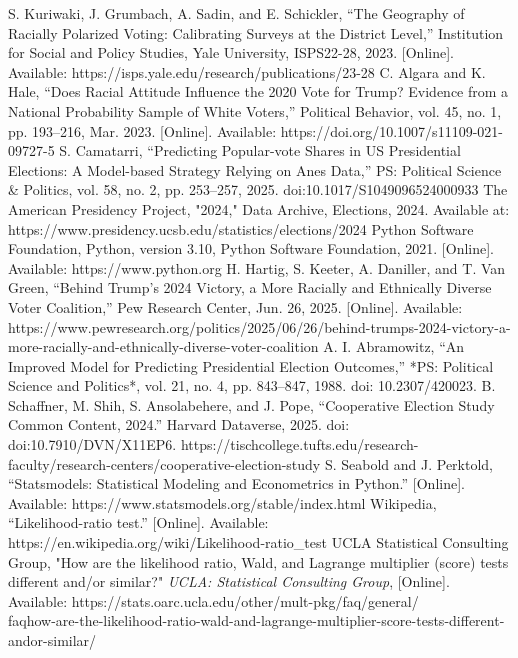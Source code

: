 \documentclass[letter]{article}
\begin{document}
\begin{thebibliography}{00}
 S. Kuriwaki, J. Grumbach, A. Sadin, and E. Schickler, “The Geography of Racially Polarized Voting: Calibrating Surveys at the District Level,” Institution for Social and Policy Studies, Yale University, ISPS22-28, 2023. [Online]. Available: https://isps.yale.edu/research/publications/23-28
 C. Algara and K. Hale, “Does Racial Attitude Influence the 2020 Vote for Trump? Evidence from a National Probability Sample of White Voters,” Political Behavior, vol. 45, no. 1, pp. 193–216, Mar. 2023. [Online]. Available: https://doi.org/10.1007/s11109-021-09727-5
 S. Camatarri, “Predicting Popular-vote Shares in US Presidential Elections: A Model-based Strategy Relying on Anes Data,” PS: Political Science \& Politics, vol. 58, no. 2, pp. 253–257, 2025. doi:10.1017/S1049096524000933
 The American Presidency Project, "2024," Data Archive, Elections, 2024. Available at: https://www.presidency.ucsb.edu/statistics/elections/2024
 Python Software Foundation, Python, version 3.10, Python Software Foundation, 2021. [Online]. Available: https://www.python.org
 H. Hartig, S. Keeter, A. Daniller, and T. Van Green, “Behind Trump’s 2024 Victory, a More Racially and Ethnically Diverse Voter Coalition,” Pew Research Center, Jun. 26, 2025. [Online]. Available: https://www.pewresearch.org/politics/2025/06/26/behind-trumps-2024-victory-a-more-racially-and-ethnically-diverse-voter-coalition
 A. I. Abramowitz, “An Improved Model for Predicting Presidential Election Outcomes,” *PS: Political Science and Politics*, vol. 21, no. 4, pp. 843–847, 1988. doi: 10.2307/420023.
 B. Schaffner, M. Shih, S. Ansolabehere, and J. Pope, “Cooperative Election Study Common Content, 2024.” Harvard Dataverse, 2025. doi: doi:10.7910/DVN/X11EP6. 
 https://tischcollege.tufts.edu/research-faculty/research-centers/cooperative-election-study
 S. Seabold and J. Perktold, “Statsmodels: Statistical Modeling and Econometrics in Python.” [Online]. Available: https://www.statsmodels.org/stable/index.html
 Wikipedia, “Likelihood-ratio test.” [Online]. Available: https://en.wikipedia.org/wiki/Likelihood-ratio\_test
UCLA Statistical Consulting Group, "How are the likelihood ratio, Wald, and Lagrange multiplier (score) tests different and/or similar?" \textit{UCLA: Statistical Consulting Group}, [Online]. Available: https://stats.oarc.ucla.edu/other/mult-pkg/faq/general/\\faqhow-are-the-likelihood-ratio-wald-and-lagrange-multiplier-score-tests-different-andor-similar/

\end{thebibliography}
\end{document}
